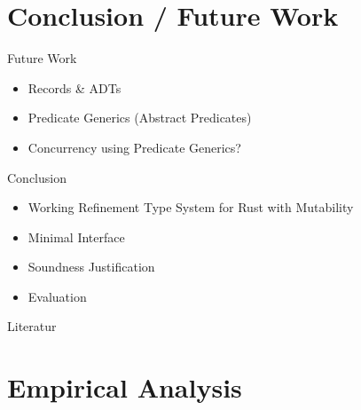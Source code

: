 \documentclass{sdqbeamer}
\begin{document}
\section{Conclusion / Future Work}


\begin{frame}{Future Work}
  \begin{itemize}
    \item Records \& ADTs 
    \item Predicate Generics (Abstract Predicates)
    \item Concurrency using Predicate Generics?
  \end{itemize}
\end{frame}

\begin{frame}{Conclusion}
  \begin{itemize}
    \item Working Refinement Type System for Rust with Mutability
    \item Minimal Interface
    \item Soundness Justification
    \item Evaluation
  \end{itemize}
\end{frame}


\begin{frame}[allowframebreaks]{Literatur}
  \tiny{
    \printbibliography
  }
\end{frame}

\appendix

\beginbackup


\section{Empirical Analysis}
\end{document}
